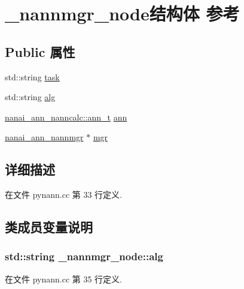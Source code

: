 \hypertarget{struct__nannmgr__node}{}\section{\+\_\+nannmgr\+\_\+node结构体 参考}
\label{struct__nannmgr__node}
\subsection*{Public 属性}
\begin{DoxyCompactItemize}
\item 
std\+::string \hyperlink{struct__nannmgr__node_af36c967eb949e00426e4b5ebfed4553d}{task}
\item 
std\+::string \hyperlink{struct__nannmgr__node_a0c18527e5a7545153dec9cde85032b1f}{alg}
\item 
\hyperlink{classnanai_1_1nanai__ann__nanncalc_1_1ann__t}{nanai\+\_\+ann\+\_\+nanncalc\+::ann\+\_\+t} \hyperlink{struct__nannmgr__node_a610ea5ea6fe3cff8a7554ccff7a10f5d}{ann}
\item 
\hyperlink{classnanai_1_1nanai__ann__nannmgr}{nanai\+\_\+ann\+\_\+nannmgr} $\ast$ \hyperlink{struct__nannmgr__node_a26300b0fc49531f10ecf0adbc4395095}{mgr}
\end{DoxyCompactItemize}


\subsection{详细描述}


在文件 pynann.\+cc 第 33 行定义.



\subsection{类成员变量说明}
\hypertarget{struct__nannmgr__node_a0c18527e5a7545153dec9cde85032b1f}{}
\subsubsection[{alg}]{\setlength{\rightskip}{0pt plus 5cm}std\+::string \+\_\+nannmgr\+\_\+node\+::alg}\label{struct__nannmgr__node_a0c18527e5a7545153dec9cde85032b1f}


在文件 pynann.\+cc 第 35 行定义.

\hypertarget{struct__nannmgr__node_a610ea5ea6fe3cff8a7554ccff7a10f5d}{}
